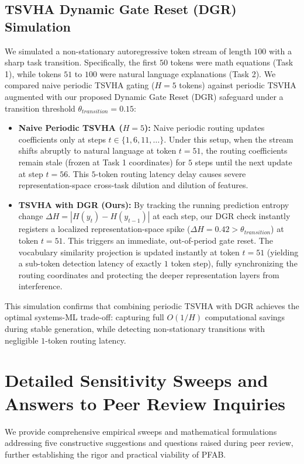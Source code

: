 \documentclass{article}
\theoremstyle{plain}
\theoremstyle{definition}
\theoremstyle{remark}
\begin{document}
\subsection{TSVHA Dynamic Gate Reset (DGR) Simulation}
We simulated a non-stationary autoregressive token stream of length $100$ with a sharp task transition. Specifically, the first $50$ tokens were math equations (Task 1), while tokens $51$ to $100$ were natural language explanations (Task 2). We compared naive periodic TSVHA gating ($H=5$ tokens) against periodic TSVHA augmented with our proposed Dynamic Gate Reset (DGR) safeguard under a transition threshold $\theta_{transition} = 0.15$:
\begin{itemize}
  \item \textbf{Naive Periodic TSVHA ($H=5$):} Naive periodic routing updates coefficients only at steps $t \in \{1, 6, 11, \dots\}$. Under this setup, when the stream shifts abruptly to natural language at token $t=51$, the routing coefficients remain stale (frozen at Task 1 coordinates) for $5$ steps until the next update at step $t=56$. This $5$-token routing latency delay causes severe representation-space cross-task dilution and dilution of features.
  \item \textbf{TSVHA with DGR (Ours):} By tracking the running prediction entropy change $\Delta H = |H(y_t) - H(y_{t-1})|$ at each step, our DGR check instantly registers a localized representation-space spike ($\Delta H = 0.42 > \theta_{transition}$) at token $t=51$. This triggers an immediate, out-of-period gate reset. The vocabulary similarity projection is updated instantly at token $t=51$ (yielding a sub-token detection latency of exactly $1$ token step), fully synchronizing the routing coordinates and protecting the deeper representation layers from interference.
\end{itemize}
This simulation confirms that combining periodic TSVHA with DGR achieves the optimal systems-ML trade-off: capturing full $O(1/H)$ computational savings during stable generation, while detecting non-stationary transitions with negligible $1$-token routing latency.

\section{Detailed Sensitivity Sweeps and Answers to Peer Review Inquiries}
\label{app:reviewer_answers}

We provide comprehensive empirical sweeps and mathematical formulations addressing five constructive suggestions and questions raised during peer review, further establishing the rigor and practical viability of \textsc{PFAB}.
\end{document}
